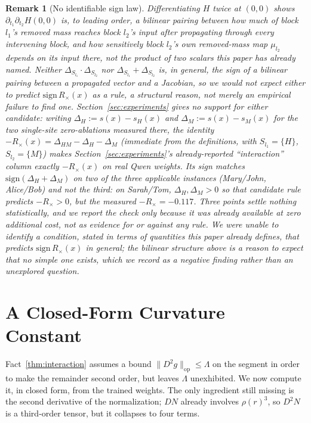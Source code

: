 \documentclass[11pt,a4paper]{article}
\newtheorem{remark}{Remark}
\begin{document}
\begin{remark}[No identifiable sign law]
\label{rem:signlaw}
Differentiating $H$ twice at $(0,0)$ shows $\partial_{t_1}\partial_{t_2}H(0,0)$
is, to leading order, a \emph{bilinear} pairing between how much of block
$l_1$'s removed mass reaches block $l_2$'s input after propagating through
every intervening block, and how sensitively block $l_2$'s own removed-mass
map $\mu_{l_2}$ depends on its input there, not the product of two scalars
this paper has already named. Neither $\Delta_{S_{l_1}}\cdot\Delta_{S_{l_2}}$
nor $\Delta_{S_{l_1}}+\Delta_{S_{l_2}}$ is, in general, the sign of a bilinear
pairing between a propagated vector and a Jacobian, so we would not expect
either to predict $\mathrm{sign}\,R_\times(x)$ as a rule, a structural
reason, not merely an empirical failure to find one. Section~\ref{sec:experiments}
gives no support for either candidate: writing $\Delta_H:=s(x)-s_H(x)$ and
$\Delta_M:=s(x)-s_M(x)$ for the two single-site zero-ablations measured
there, the identity $-R_\times(x)=\Delta_{HM}-\Delta_H-\Delta_M$ (immediate
from the definitions, with $S_{l_1}=\{H\}$, $S_{l_2}=\{M\}$) makes
Section~\ref{sec:experiments}'s already-reported ``interaction'' column exactly
$-R_\times(x)$ on real Qwen weights. Its sign matches
$\mathrm{sign}(\Delta_H+\Delta_M)$ on two of the three applicable instances
(Mary/John, Alice/Bob) and not the third: on Sarah/Tom, $\Delta_H,\Delta_M>0$
so that candidate rule predicts $-R_\times>0$, but the measured
$-R_\times=-0.117$. Three points settle nothing statistically, and we report
the check only because it was already available at zero additional cost, not
as evidence for or against any rule. We were unable to identify a condition,
stated in terms of quantities this paper already defines, that predicts
$\mathrm{sign}\,R_\times(x)$ in general; the bilinear structure above is a
reason to expect that no simple one exists, which we record as a negative
finding rather than an unexplored question.
\end{remark}

\section{A Closed-Form Curvature Constant}
\label{sec:curvature}

Fact~\ref{thm:interaction} assumes a bound $\|D^2g\|_{\mathrm{op}}\le\Lambda$
on the segment in order to make the remainder second order, but leaves
$\Lambda$ unexhibited. We now compute it, in closed form, from the trained
weights. The only ingredient still missing is the second derivative of the
normalization; $DN$ already involves $\rho(r)^3$, so $D^2N$ is a third-order
tensor, but it collapses to four terms.
\end{document}
